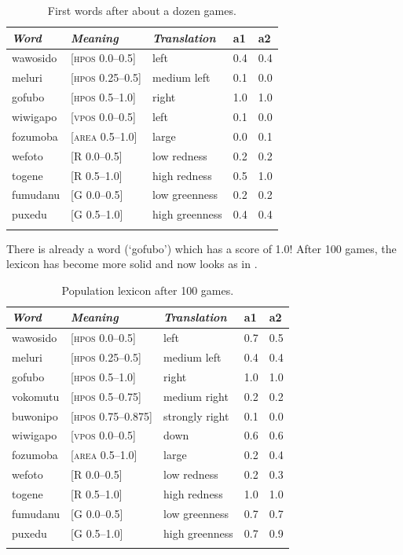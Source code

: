 \begin{table}
\begin{center}
\begin{tabular}{lllll}
\lsptoprule
{\itshape Word}&{\itshape Meaning}&{\itshape Translation} & {\bfshape a1}&{\bfshape a2} \\ \midrule
wawosido & [\textsc{hpos} 0.0–0.5] &left&0.4&0.4\\ 
meluri & [\textsc{hpos} 0.25–0.5] &medium left&0.1&0.0\\ 
gofubo & [\textsc{hpos} 0.5–1.0]& right&1.0&1.0\\ 
wiwigapo & [\textsc{vpos} 0.0–0.5] &left&0.1&0.0\\ 
fozumoba & [\textsc{area} 0.5–1.0]&large & 0.0&0.1\\ 
wefoto & [R 0.0–0.5]& low redness &0.2&0.2\\ 
togene & [R 0.5–1.0]& high redness &0.5&1.0\\ 
fumudanu & [G 0.0–0.5]& low greenness &0.2&0.2\\ 
puxedu & [G 0.5–1.0]& high greenness &0.4&0.4\\ 
\lspbottomrule
\end{tabular}
\caption{\label{tab:game50}First words after about a dozen games.}
\end{center}
\end{table}

There is already a word (`gofubo') which has
a score of 1.0! After 100 games, the lexicon has become more 
solid and now looks as in .    


\begin{table}
\begin{center}
\begin{tabular}{lllll}
\lsptoprule
{\itshape Word}&{\itshape Meaning}&{\itshape Translation} & {\bfshape a1}&{\bfshape a2} \\ \midrule
wawosido & [\textsc{hpos} 0.0–0.5] &left&0.7&0.5\\ 
meluri & [\textsc{hpos} 0.25–0.5] &medium left&0.4&0.4\\ 
gofubo & [\textsc{hpos} 0.5–1.0]& right&1.0&1.0\\ 
vokomutu & [\textsc{hpos} 0.5–0.75] &medium right&0.2&0.2\\ 
buwonipo & [\textsc{hpos} 0.75–0.875] &strongly right&0.1&0.0\\ 
wiwigapo & [\textsc{vpos} 0.0–0.5] &down&0.6&0.6\\ 
fozumoba & [\textsc{area} 0.5–1.0]&large & 0.2&0.4\\ 
wefoto & [R 0.0–0.5]& low redness &0.2&0.3\\ 
togene & [R 0.5–1.0]& high redness &1.0&1.0\\ 
fumudanu & [G 0.0–0.5]& low greenness &0.7&0.7\\ 
puxedu & [G 0.5–1.0]& high greenness &0.7&0.9\\ 
\lspbottomrule
\end{tabular}
\caption{\label{tab:goubo}Population lexicon after 100 games.}
\end{center}
\end{table}


